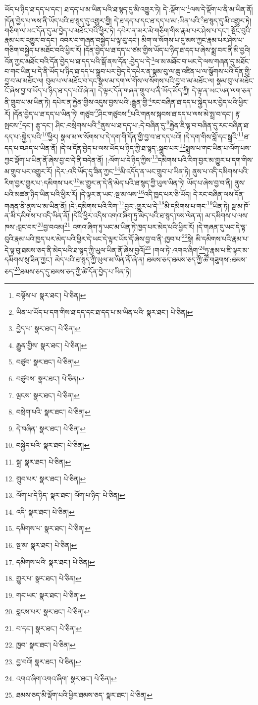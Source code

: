 ཡོད་པ་ཉིད་ཐ་དད་པ་དང་། ཐ་དད་པ་མ་ཡིན་པའི་ཐ་སྙད་དུ་མི་འགྱུར་ཏེ། དེ་:ལྡོག་པ་\footnote{བལྟོས་པ་  སྣར་ཐང་།  པེ་ཅིན། }ལས་དེ་ལྡོག་པ་ནི་མ་ཡིན་ནོ། །དོན་བྱེད་པ་ལས་ནི་ཡོད་པའི་ཐ་སྙད་དུ་འགྱུར་གྱི། དེ་ཐ་དད་པ་དང་ཐ་དད་པ་མ་:ཡིན་པའི་\footnote{ཡིན་པ་ཡོད་པ་དག་གིས་ཐ་དད་དང་ཐ་དད་པ་མ་ཡིན་པའི་  སྣར་ཐང་།  པེ་ཅིན། }ཐ་སྙད་དུ་མི་འགྱུར་ཏེ། གཅིག་ལ་ཡང་དོན་དུ་མ་བྱེད་པ་མཐོང་བའི་ཕྱིར་ཏེ། དཔེར་ན་མར་མེ་གཅིག་གིས་རྣམ་པར་ཤེས་པ་དང་། སྡོང་བུའི་རྣམ་པར་འགྱུར་བ་དང་། འབར་བ་གཞན་བསྐྱེད་པ་ལྟ་བུ་དང་། མིག་ལ་སོགས་པ་དུ་མས་ཀྱང་རྣམ་པར་ཤེས་པ་གཅིག་བསྐྱེད་པ་མཐོང་བའི་ཕྱིར་རོ། །དོན་བྱེད་པ་ཐ་དད་པ་ཙམ་གྱིས་ཡོད་པ་ཉིད་ཐ་དད་པ་ཞེས་སྨྲ་བར་ནི་མི་བྱའི། འོན་ཀྱང་མཐོང་བའི་དོན་བྱེད་པ་ཐ་དད་པའི་སྒོ་ནས་དོན་:བྱེད་པ་དེ་\footnote{བྱེད་པ་  སྣར་ཐང་།  པེ་ཅིན། }ལ་མ་མཐོང་བ་ཡང་དེ་ལས་གཞན་དུ་མཐོང་བ་གང་ཡིན་པ་དེ་ནི་ཡོད་པ་ཉིད་ཐ་དད་པ་སྒྲུབ་པར་བྱེད་དེ་དཔེར་ན་སྣམ་བུ་ལ་ཆུ་འཛིན་པ་ལ་སྩོགས་པའི་དོན་གྱི་བྱ་བ་མ་མཐོང་ལ། བུམ་པ་ལ་མཐོང་བ་དང་སྣལ་མ་དག་ལ་གོས་ལ་སོགས་པའི་བྱ་བ་མ་མཐོང་ལ། སྣམ་བུ་ལ་མཐོང་ངོ་ཞེས་བྱ་བ་ཡོད་པ་ཉིད་ཐ་དད་པའོ་ཞེ་ན། དེ་ལྟར་དོན་གཞན་གྲུབ་པ་ནི་ཡོད་མོད་ཀྱི། དེ་ལྟ་ན་ཡང་ཡན་ལག་ཅན་ནི་གྲུབ་པ་མ་ཡིན་ཏེ། དཔེར་ན་རྐྱེན་གྱིས་འདུས་བྱས་པའི་:རྒྱུན་གྱི་\footnote{རྒྱུན་གྱིས་  སྣར་ཐང་།  པེ་ཅིན། }རང་བཞིན་ཐ་དད་པ་སྐྱེད་པར་བྱེད་པའི་ཕྱིར་རོ། །དོན་བྱེད་པ་ཐ་དད་པ་ཡིན་ཏེ། གཙུབ་\footnote{བཙུབ་  སྣར་ཐང་།  པེ་ཅིན། }ཤིང་གཙུབས་\footnote{བཙུབས་  སྣར་ཐང་།  པེ་ཅིན། }པའི་གནས་སྐབས་ཐ་དད་པ་ལས་མེ་སྤྲ་བ་དང་། རྟ་སྤངས་\footnote{ལྦངས་  སྣར་ཐང་།  པེ་ཅིན། }དང་། རྩྭ་དང་། ཤིང་:བསྲེགས་པའི་\footnote{བསྲེག་པའི་  སྣར་ཐང་།  པེ་ཅིན། }ནུས་པ་ཐ་དད་པ་:དེ་བཞིན་དུ་\footnote{དེ་བཞིན་  སྣར་ཐང་།  པེ་ཅིན། }རྐྱེན་ཇི་ལྟ་བ་བཞིན་དུ་རང་བཞིན་ཐ་དད་པ་:སྐྱེད་པའི་\footnote{བསྐྱེད་པའི་  སྣར་ཐང་།  པེ་ཅིན། }ཕྱིར། སྣལ་མ་ལ་སོགས་པ་དེ་དག་གི་དོན་གྱི་བྱ་བ་ཐ་དད་པའོ། །དེ་དག་གིས་བློ་དང་སྒྲའི་\footnote{སྒྲ་  སྣར་ཐང་།  པེ་ཅིན། }ཐ་དད་པ་བཤད་པ་ཡིན་ནོ། །དེ་ལ་དོན་བྱེད་པ་ལས་ཡོད་པ་ཉིད་ཀྱི་ཐ་སྙད་:སྒྲུབ་པར་\footnote{གྲུབ་པར་  སྣར་ཐང་།  པེ་ཅིན། }སྨྲས་པ་གང་ཡིན་པ་ལོག་པས་ཀྱང་ལྡོག་པ་ཡིན་ནོ་ཞེས་བྱ་བ་དེ་ནི་བདེན་ནོ། །:ལོག་པ་དེ་ཉིད་ཀྱིས་\footnote{ལོག་པ་དེ་ཉིད་  སྣར་ཐང་། ལོག་པ་ཉིད་  པེ་ཅིན། }དམིགས་པའི་རིག་བྱར་མ་གྱུར་པ་དག་གིས་མ་གྲུབ་པར་འགྱུར་རོ། །དེར་:འདི་ཡོད་དུ་ཟིན་ཀྱང་\footnote{འདི་  སྣར་ཐང་།  པེ་ཅིན། }མི་འདོད་ན་ཡང་གྲུབ་པ་ཡིན་ཏེ། ནུས་པ་འདི་དམིགས་པའི་རིག་བྱར་གྱུར་པ་:དམིགས་པར་\footnote{དམིགས་པ་  སྣར་ཐང་།  པེ་ཅིན། }མ་གྱུར་ན་དེ་ནི་མེད་པའི་ཐ་སྙད་ཀྱི་ཡུལ་ཡིན་ཏེ། ཡོད་པ་ཞེས་བྱ་བ་ནི། ནུས་པའི་མཚན་ཉིད་ཡིན་པའི་ཕྱིར་རོ། །དེ་ལྟར་ན་ཡང་:སྔ་མ་ལས་\footnote{སྔ་མ་  སྣར་ཐང་།  པེ་ཅིན། }འདི་ཁྱད་པར་ཅི་ཡོད། དེ་རང་བཞིན་ལས་དོན་གཞན་ནི་ནུས་པ་མ་ཡིན་ནོ། །དེ་:དམིགས་པའི་རིག་\footnote{དམིགས་པའི་  སྣར་ཐང་།  པེ་ཅིན། }བྱར་:གྱུར་པ་དེ་\footnote{གྱུར་པ་  སྣར་ཐང་།  པེ་ཅིན། }མི་དམིགས་པ་གང་\footnote{གང་ཡང་  སྣར་ཐང་།  པེ་ཅིན། }ཡིན་ཏེ། སྔ་མ་ཁོ་ན་མི་དམིགས་པ་འདི་ཡིན་ནོ། །དེའི་ཕྱིར་འདིས་འགའ་ཞིག་ཏུ་མེད་པའི་ཐ་སྙད་ཁས་ལེན་ན། མ་དམིགས་པ་ལས་ཁས་:བླང་བར་\footnote{བླངས་པར་  སྣར་ཐང་།  པེ་ཅིན། }བྱ་བའམ།\footnote{བ་དང་།  སྣར་ཐང་།  པེ་ཅིན། } འགའ་ཞིག་ཏུ་ཡང་མ་ཡིན་ཏེ་ཁྱད་པར་མེད་པའི་ཕྱིར་རོ། །དེ་གཞན་དུ་ཡང་དེ་ལྟ་བུའི་རྣམ་པའི་ཁྱད་པར་མེད་པའི་ཕྱིར་དེ་ཡང་དེ་ལྟར་ཡོད་དོ་ཞེས་བྱ་བ་ནི་:ཁྱབ་པ་\footnote{ཁྱབ་  སྣར་ཐང་།  པེ་ཅིན། }སྟེ། མི་དམིགས་པའི་རྣམ་པ་དེ་ལྟ་བུ་ཐམས་ཅད་ནི་མེད་པའི་ཐ་སྙད་ཀྱི་ཡུལ་ཡིན་ནོ་ཞེས་བྱའོ།\footnote{བྱ་བའོ།  སྣར་ཐང་།  པེ་ཅིན། } །གལ་ཏེ་:འགའ་ཞིག་\footnote{འགའ་ཞིག་འགའ་ཞིག་  སྣར་ཐང་།  པེ་ཅིན། }ཏུ་རྣམ་པ་ཇི་ལྟར་མ་དམིགས་སུ་ཟིན་ཀྱང་། མེད་པའི་ཐ་སྙད་ཀྱི་ཡུལ་མ་ཡིན་ནོ་ཞེ་ན། ཐམས་ཅད་ཐམས་ཅད་ཀྱི་ཚེ་གཟུགས་:ཐམས་ཅད་\footnote{ཐམས་ཅད་མི་ལྡོག་པའི་ཕྱིར་ཐམས་ཅད་  སྣར་ཐང་།  པེ་ཅིན། }ཐམས་ཅད་དུ་ཐམས་ཅད་ཀྱི་ཚེ་དོན་བྱེད་པ་ཡིན་ཏེ། 